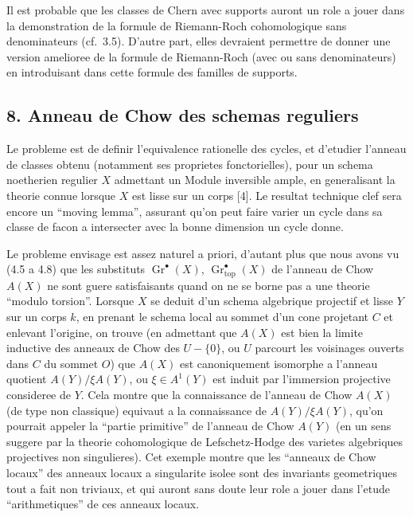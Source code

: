 Il est probable que les classes de Chern avec supports auront un role a jouer dans la demonstration de la formule de Riemann-Roch cohomologique sans denominateurs (cf.\ 3.5). D'autre part, elles devraient permettre de donner une version amelioree de la formule de Riemann-Roch (avec ou sans denominateurs) en introduisant dans cette formule des familles de supports.

\subsection*{8. Anneau de Chow des schemas reguliers}

Le probleme est de definir l'equivalence rationelle des cycles, et d'etudier l'anneau de classes obtenu (notamment ses proprietes fonctorielles), pour un schema noetherien regulier $X$ admettant un Module inversible ample, en generalisant la theorie connue lorsque $X$ est lisse sur un corps [4]. Le resultat technique clef sera encore un ``moving lemma'', assurant qu'on peut faire varier un cycle dans sa classe de facon a intersecter avec la bonne dimension un cycle donne.

Le probleme envisage est assez naturel a priori, d'autant plus que nous avons vu (4.5 a 4.8) que les substituts $\operatorname{Gr}^{\bullet}(X)$, $\operatorname{Gr}_{\mathrm{top}}^{\bullet}(X)$ de l'anneau de Chow $A(X)$ ne sont guere satisfaisants quand on ne se borne pas a une theorie ``modulo torsion''. Lorsque $X$ se deduit d'un schema algebrique projectif et lisse $Y$ sur un corps $k$, en prenant le schema local au sommet d'un cone projetant $C$ et enlevant l'origine, on trouve (en admettant que $A(X)$ est bien la limite inductive des anneaux de Chow des $U - \{0\}$, ou $U$ parcourt les voisinages ouverts dans $C$ du sommet $O$) que $A(X)$ est canoniquement isomorphe a l'anneau quotient $A(Y)/\xi A(Y)$, ou $\xi \in A^{1}(Y)$ est induit par l'immersion projective consideree de $Y$. Cela montre que la connaissance de l'anneau de Chow $A(X)$ (de type non classique) equivaut a la connaissance de $A(Y)/\xi A(Y)$, qu'on pourrait appeler la ``partie primitive'' de l'anneau de Chow $A(Y)$ (en un sens suggere par la theorie cohomologique de Lefschetz-Hodge des varietes algebriques projectives non singulieres). Cet exemple montre que les ``anneaux de Chow locaux'' des anneaux locaux a singularite isolee sont des invariants geometriques tout a fait non triviaux, et qui auront sans doute leur role a jouer dans l'etude ``arithmetiques'' de ces anneaux locaux.

